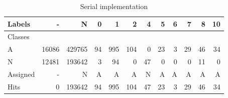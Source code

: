 
\begin{table}[h]%
{\scriptsize
\setlength\tabcolsep{0.5em}
\begin{center}
\caption{Serial implementation}
\label{tab:libc-matrix}
\begin{tabular}{l|r|r|r|r|r|r|r|r|r|r|r}
  Labels &      - &       N &   0 &    1 &    2 &   4 &   5 &  6 &   7 &   8 &  10 \\\hline
  Classes  &        &         &     &      &      &     &     &    &     &     &     \\\hline
  \hline
  A        &  16086 &  429765 &  94 &  995 &  104 &   0 &  23 &  3 &  29 &  46 &  34 \\\hline
  N        &  12481 &  193642 &   3 &   94 &    0 &  47 &   0 &  0 &   0 &  11 &   0 \\\hline
  \hline
  Assigned &      - &       N &   A &    A &    A &   N &   A &  A &   A &   A &   A \\\hline
  Hits     &      0 &  193642 &  94 &  995 &  104 &  47 &  23 &  3 &  29 &  46 &  34 
\end{tabular}
\end{center}
}
\end{table}

\vspace{3ex}

